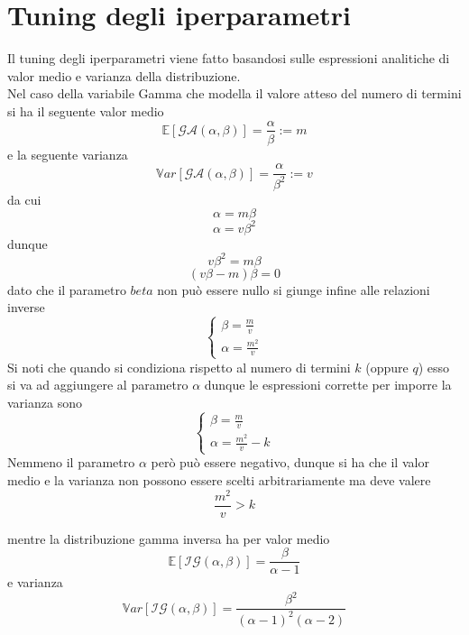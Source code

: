 \chapter{Tuning degli iperparametri}
Il tuning degli iperparametri viene fatto basandosi sulle espressioni analitiche di valor medio e varianza della distribuzione.\\
Nel caso della variabile Gamma che modella il valore atteso del numero di termini si ha il seguente valor medio
\begin{equation}
\mathbb{E}[\mathcal{G}\mathcal{A}(\alpha,\beta)]=\frac{\alpha}{\beta}:=m
\end{equation}
e la seguente varianza
\begin{equation}
\mathbb{V}ar[\mathcal{G}\mathcal{A}(\alpha,\beta)]=\frac{\alpha}{\beta^2}:=v
\end{equation}
da cui
\begin{equation}
\alpha=m\beta
\end{equation}
\begin{equation}
\alpha=v\beta^2
\end{equation}
dunque
\begin{equation}
v\beta^2=m\beta
\end{equation}
\begin{equation}
(v\beta-m)\beta=0
\end{equation}
dato che il parametro $beta$ non può essere nullo si giunge infine alle relazioni inverse
\begin{equation}
\begin{cases}
\beta=\frac{m}{v}\\
\alpha=\frac{m^2}{v}
\end{cases}
\end{equation}
Si noti che quando si condiziona rispetto al numero di termini $k$ (oppure $q$) esso si va ad aggiungere al parametro $\alpha$
dunque le espressioni corrette per imporre la varianza sono
\begin{equation}
\begin{cases}
\beta=\frac{m}{v}\\
\alpha=\frac{m^2}{v}-k
\end{cases}
\end{equation}
Nemmeno il parametro $\alpha$ però può essere negativo, dunque si ha che il valor medio e la varianza non possono essere scelti arbitrariamente ma deve valere
\begin{equation}
\frac{m^2}{v}>k
\end{equation}

mentre la distribuzione gamma inversa ha per valor medio
\begin{equation}
\mathbb{E}[\mathcal{I}\mathcal{G}(\alpha,\beta)]=\frac{\beta}{\alpha-1}
\end{equation}
e varianza
\begin{equation}
\mathbb{V}ar[\mathcal{I}\mathcal{G}(\alpha,\beta)]=\frac{\beta^2}{(\alpha-1)^2(\alpha-2)}
\end{equation}
